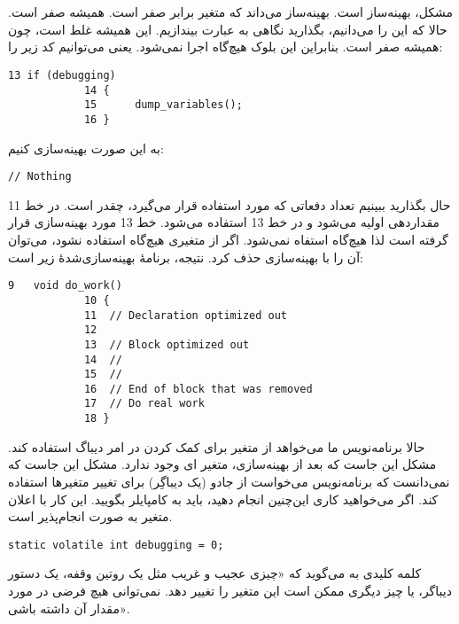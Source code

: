 \section{}
\paragraph{}\label{answer:84}
 مشکل، بهینه‌ساز است. بهینه‌ساز می‌داند که متغیر  برابر صفر است. همیشه صفر است. حالا که این را می‌دانیم، بگذارید نگاهی به عبارت  بیندازیم. این همیشه غلط است، چون  همیشه صفر است. بنابراین این بلوک هیچ‌گاه اجرا نمی‌شود. یعنی می‌توانیم کد زیر را:
\begin{LTR}
        \begin{lstlisting}[style=C++Style]
            13 if (debugging)
            14 {
            15 	    dump_variables();
            16 }
        \end{lstlisting}
\end{LTR}

 به این صورت بهینه‌سازی کنیم:
 \begin{LTR}
        \begin{lstlisting}[style=C++Style]
            // Nothing
        \end{lstlisting}
\end{LTR}

حال بگذارید ببینیم تعداد دفعاتی که  مورد استفاده قرار می‌گیرد، چقدر است. در خط 11 مقداردهی اولیه می‌شود و در خط 13 استفاده می‌شود. خط 13 مورد بهینه‌سازی قرار گرفته است لذا  هیچ‌گاه استفاه نمی‌شود. اگر از متغیری هیچ‌گاه استفاده نشود، می‌توان آن را با بهینه‌سازی حذف کرد. نتیجه، برنامهٔ بهینه‌سازی‌شدهٔ زیر است:
\begin{LTR}
        \begin{lstlisting}[style=C++Style]
            9   void do_work()
            10 {
            11 	// Declaration optimized out
            12
            13 	// Block optimized out
            14 	//
            15 	//
            16 	// End of block that was removed
            17 	// Do real work
            18 }
        \end{lstlisting}
\end{LTR}

حالا برنامه‌نویس ما می‌خواهد از متغیر  برای کمک کردن در امر دیباگ استفاده کند. مشکل این جاست که بعد از بهینه‌سازی، متغیر ای وجود ندارد. مشکل این جاست که  نمی‌دانست که برنامه‌نویس می‌خواست از جادو (یک دیباگِر) برای تغییر متغیرها استفاده کند. اگر می‌خواهید کاری این‌چنین انجام دهید، باید به کامپایلر بگویید. این کار با اعلان متغیر  به صورت  انجام‌پذیر است.
\begin{LTR}
        \begin{lstlisting}[style=C++Style]
            static volatile int debugging = 0;
        \end{lstlisting}
\end{LTR}

کلمه کلیدی  به  می‌گوید که «چیزی عجیب و غریب مثل یک روتین وقفه، یک دستور دیباگر، یا چیز دیگری ممکن است این متغیر را تغییر دهد. نمی‌توانی هیچ فرضی در مورد مقدار آن داشته باشی».
